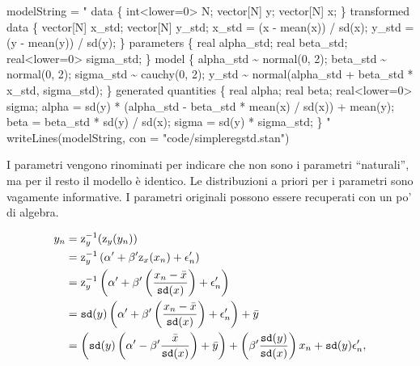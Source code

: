\documentclass[
]{memoir}
\newenvironment{Shaded}{\begin{snugshade}}{\end{snugshade}}
\newcommand{\AttributeTok}[1]{\textcolor[rgb]{0.77,0.63,0.00}{#1}}
\newcommand{\FunctionTok}[1]{\textcolor[rgb]{0.00,0.00,0.00}{#1}}
\newcommand{\NormalTok}[1]{#1}
\newcommand{\OtherTok}[1]{\textcolor[rgb]{0.56,0.35,0.01}{#1}}
\newcommand{\StringTok}[1]{\textcolor[rgb]{0.31,0.60,0.02}{#1}}
\begin{document}
\begin{Shaded}
\begin{Highlighting}[]
\NormalTok{modelString }\OtherTok{=} \StringTok{"}
\StringTok{data \{}
\StringTok{  int\textless{}lower=0\textgreater{} N;}
\StringTok{  vector[N] y;}
\StringTok{  vector[N] x;}
\StringTok{\}}
\StringTok{transformed data \{}
\StringTok{  vector[N] x\_std;}
\StringTok{  vector[N] y\_std;}
\StringTok{  x\_std = (x {-} mean(x)) / sd(x);}
\StringTok{  y\_std = (y {-} mean(y)) / sd(y);}
\StringTok{\}}
\StringTok{parameters \{}
\StringTok{  real alpha\_std;}
\StringTok{  real beta\_std;}
\StringTok{  real\textless{}lower=0\textgreater{} sigma\_std;}
\StringTok{\}}
\StringTok{model \{}
\StringTok{  alpha\_std \textasciitilde{} normal(0, 2);}
\StringTok{  beta\_std \textasciitilde{} normal(0, 2);}
\StringTok{  sigma\_std \textasciitilde{} cauchy(0, 2);}
\StringTok{  y\_std \textasciitilde{} normal(alpha\_std + beta\_std * x\_std, sigma\_std);}
\StringTok{\}}
\StringTok{generated quantities \{}
\StringTok{  real alpha;}
\StringTok{  real beta;}
\StringTok{  real\textless{}lower=0\textgreater{} sigma;}
\StringTok{  alpha = sd(y) * (alpha\_std {-} beta\_std * mean(x) / sd(x))}
\StringTok{           + mean(y);}
\StringTok{  beta = beta\_std * sd(y) / sd(x);}
\StringTok{  sigma = sd(y) * sigma\_std;}
\StringTok{\}}
\StringTok{"}
\FunctionTok{writeLines}\NormalTok{(modelString, }\AttributeTok{con =} \StringTok{"code/simpleregstd.stan"}\NormalTok{)}
\end{Highlighting}
\end{Shaded}

I parametri vengono rinominati per indicare che non sono i parametri ``naturali'', ma per il resto il modello è identico. Le distribuzioni a priori per i parametri sono vagamente informative. I parametri originali possono essere recuperati con un po' di algebra.

\begin{align}
y_n &= \textrm{z}_y^{-1}(\textrm{z}_y(y_n)) \notag\\
    &= \textrm{z}_y^{-1}
\left( \alpha' + \beta' \textrm{z}_x(x_n) + \epsilon_n' \right) \notag\\
    &= \textrm{z}_y^{-1}
\left( \alpha' + \beta' \left( \frac{x_n - \bar{x}}{\texttt{sd}(x)} \right) + \epsilon_n' \right) \notag\\
    &= \texttt{sd}(y)
\left( \alpha' + \beta' \left( \frac{x_n - \bar{x}}{\texttt{sd}(x)} \right) + \epsilon_n' \right) + \bar{y} \notag\\
    &=
\left( \texttt{sd}(y) \left( \alpha' - \beta' \frac{\bar{x}}{\texttt{sd}(x)} \right) + \bar{y} \right)
+ \left( \beta' \frac{\texttt{sd}(y)}{\texttt{sd}(x)} \right) x_n
+ \texttt{sd}(y) \epsilon'_n,
\end{align}
\end{document}
